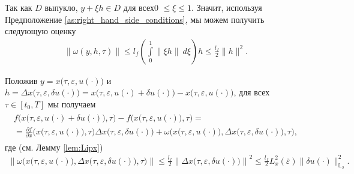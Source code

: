 \documentclass[../main.tex]{subfiles}
\begin{document}
Так как $D$ выпукло, $ y + \xi h \in D$ для всех0 $\leqslant \xi \leqslant 1$.
Значит, используя Предположение \ref{as:right_hand_side_conditions},  мы можем получить следующую оценку
\begin{gather*}
	\|\omega(y,h,\tau)\| \leqslant l_f \left( \int\limits_0^1  \left\| \xi h \right\| \ d\xi \right)h  \leqslant \frac{l_f}{2} \|h\|^2.
\end{gather*}

Положив $y = x\big(\tau,\varepsilon, u(\cdot)\big)$  и $h = \Delta x\big(\tau, \varepsilon, \delta u(\cdot)\big) = x\big(\tau,\varepsilon, u(\cdot) + \delta u(\cdot)\big) - x\big(\tau,\varepsilon, u(\cdot)\big)$, для всех $\tau \in [t_0,T]$ мы получаем
\begin{gather}\label{mean-value}
	\begin{gathered}
		f\Big(x\big(\tau,\varepsilon, u(\cdot) + \delta u(\cdot)\big),\tau\Big) -
		f\Big(x\big(\tau,\varepsilon, u(\cdot)\big),\tau\Big) = \\ = 
		\frac{\partial f}{\partial x}  \Big(x\big(\tau,\varepsilon, u(\cdot)\big), \tau\Big) 
		\Delta x\big(\tau, \varepsilon, \delta u(\cdot)\big)  + 
		\omega\Big(x\big(\tau,\varepsilon, u(\cdot)\big),\Delta x\big(\tau, \varepsilon, \delta u(\cdot)\big),\tau\Big),
	\end{gathered}
\end{gather}
где (см. Лемму \ref{lem:Lipx})
\begin{gather}\label{omega_est}
	\left\|\omega\Big(x\big(\tau,\varepsilon, u(\cdot)\big),\Delta x\big(\tau, \varepsilon, \delta u(\cdot)\big),\tau\Big)\right\| 
	\leqslant
	\frac{l_f}{2} \left\|\Delta x\big(\tau, \varepsilon, \delta u(\cdot)\big)\right\|^2 
	\leqslant
	\frac{l_f}{2} L_x^2(\overline{\varepsilon}) \|\delta u(\cdot)\|_{\mathbb{L}_2}^2.
\end{gather}
\end{document}
